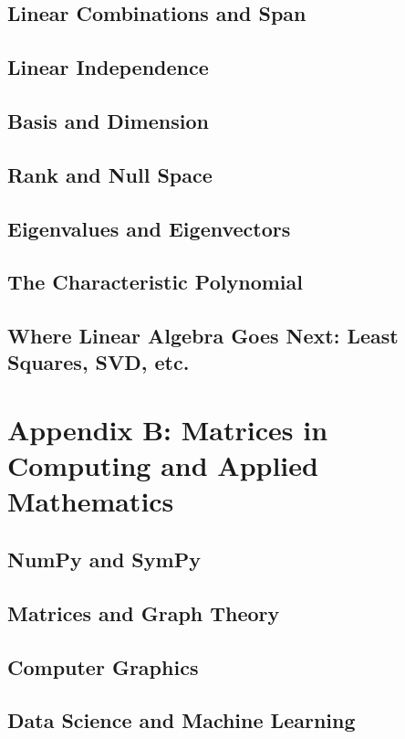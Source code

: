 \documentclass[12pt]{article}
\begin{document}
\subsection{Linear Combinations and Span}

\subsection{Linear Independence}

\subsection{Basis and Dimension}

\subsection{Rank and Null Space}

\subsection{Eigenvalues and Eigenvectors}

\subsection{The Characteristic Polynomial}

\subsection{Where Linear Algebra Goes Next: Least Squares, SVD, etc.}


\section{Appendix B: Matrices in Computing and Applied Mathematics}
\subsection{NumPy and SymPy}

\subsection{Matrices and Graph Theory}

\subsection{Computer Graphics}

\subsection{Data Science and Machine Learning}

\end{document}
